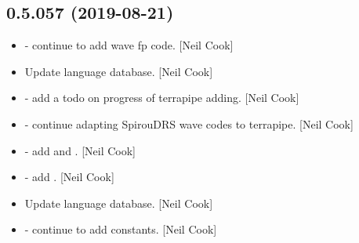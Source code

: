 \documentclass[a4paper,10pt,english]{report}
\begin{document}
\subsection{0.5.057 (2019-08-21)}
\label{\detokenize{misc/changelog:id86}}\begin{itemize}
\item {} 
 - continue to add wave fp code. {[}Neil Cook{]}

\item {} 
Update language database. {[}Neil Cook{]}

\item {} 
 - add a todo on progress of terrapipe adding. {[}Neil
Cook{]}

\item {} 
 - continue adapting SpirouDRS wave codes to
terrapipe. {[}Neil Cook{]}

\item {} 
 - add   and
. {[}Neil Cook{]}

\item {} 
 - add . {[}Neil Cook{]}

\item {} 
Update language database. {[}Neil Cook{]}

\item {} 
 - continue to add  constants. {[}Neil Cook{]}

\end{itemize}
\end{document}
